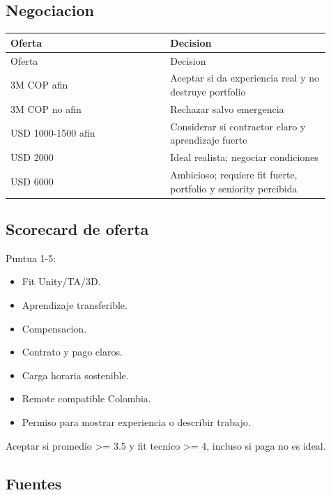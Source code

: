 \subsection{Negociacion}


\begin{center}
\scriptsize
\begin{longtable}{>{\raggedright\arraybackslash}p{0.455\linewidth} >{\raggedright\arraybackslash}p{0.455\linewidth}}
\toprule
Oferta & Decision \\
\midrule
\endfirsthead
\toprule
Oferta & Decision \\
\midrule
\endhead
3M COP afin & Aceptar si da experiencia real y no destruye portfolio \\
3M COP no afin & Rechazar salvo emergencia \\
USD 1000-1500 afin & Considerar si contractor claro y aprendizaje fuerte \\
USD 2000 & Ideal realista; negociar condiciones \\
USD 6000 & Ambicioso; requiere fit fuerte, portfolio y seniority percibida \\
\bottomrule
\end{longtable}
\end{center}



\subsection{Scorecard de oferta}


Puntua 1-5:


\begin{itemize}
\item Fit Unity/TA/3D.
\item Aprendizaje transferible.
\item Compensacion.
\item Contrato y pago claros.
\item Carga horaria sostenible.
\item Remote compatible Colombia.
\item Permiso para mostrar experiencia o describir trabajo.
\end{itemize}


Aceptar si promedio >= 3.5 y fit tecnico >= 4, incluso si paga no es ideal.


\subsection{Fuentes}


